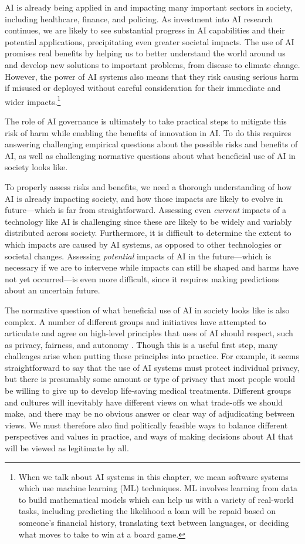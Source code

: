 \documentclass{article}
\begin{document}
AI is already being applied in and impacting many important sectors in society, including healthcare, finance, and policing. As investment into AI research continues, we are likely to see substantial progress in AI capabilities and their potential applications, precipitating even greater societal impacts. The use of AI promises real benefits by helping us to better understand the world around us and develop new solutions to important problems, from disease to climate change. However, the power of AI systems also means that they risk causing serious harm if misused or deployed without careful consideration for their immediate and wider impacts.\footnote{ When we talk about AI systems in this chapter, we mean software systems which use machine learning (ML) techniques. ML involves learning from data to build mathematical models which can help us with a variety of real-world tasks, including predicting the likelihood a loan will be repaid based on someone’s financial history, translating text between languages, or deciding what moves to take to win at a board game.}

The role of AI governance is ultimately to take practical steps to mitigate this risk of harm while enabling the benefits of innovation in AI. To do this requires answering challenging empirical questions about the possible risks and benefits of AI, as well as challenging normative questions about what beneficial use of AI in society looks like.

To properly assess risks and benefits, we need a thorough understanding of how AI is already impacting society, and how those impacts are likely to evolve in future---which is far from straightforward. Assessing even \textit{current} impacts of a technology like AI is challenging since these are likely to be widely and variably distributed across society. Furthermore, it is difficult to determine the extent to which impacts are caused by AI systems, as opposed to other technologies or societal changes. Assessing \textit{potential} impacts of AI in the future---which is necessary if we are to intervene while impacts can still be shaped and harms have not yet occurred---is even more difficult, since it requires making predictions about an uncertain future.

The normative question of what beneficial use of AI in society looks like is also complex. A number of different groups and initiatives have attempted to articulate and agree on high-level principles that uses of AI should respect, such as privacy, fairness, and autonomy  \citep{jobin_global_2019}. Though this is a useful first step, many challenges arise when putting these principles into practice. For example, it seems straightforward to say that the use of AI systems must protect individual privacy, but there is presumably some amount or type of privacy that most people would be willing to give up to develop life-saving medical treatments. Different groups and cultures will inevitably have different views on what trade-offs we should make, and there may be no obvious answer or clear way of adjudicating between views. We must therefore also find politically feasible ways to balance different perspectives and values in practice, and ways of making decisions about AI that will be viewed as legitimate by all.
\end{document}
